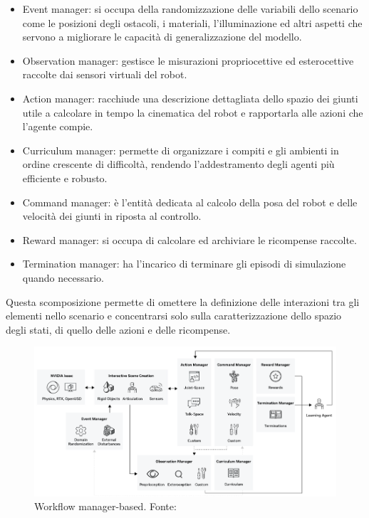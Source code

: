 \begin{itemize}
    \item Event manager: si occupa della randomizzazione delle variabili dello scenario come le posizioni degli ostacoli, i materiali, l'illuminazione ed altri aspetti che servono a migliorare le capacità di generalizzazione del modello.
    \item Observation manager: gestisce le misurazioni propriocettive ed esterocettive raccolte dai sensori virtuali del robot.
    \item Action manager: racchiude una descrizione dettagliata dello spazio dei giunti utile a calcolare in tempo la cinematica del robot e rapportarla alle azioni che l'agente compie.
    \item Curriculum manager: permette di organizzare i compiti e gli ambienti in ordine crescente di difficoltà, rendendo l'addestramento degli agenti più efficiente e robusto.
    \item Command manager: è l'entità dedicata al calcolo della posa del robot e delle velocità dei giunti in riposta al controllo.
    \item Reward manager: si occupa di calcolare ed archiviare le ricompense raccolte.
    \item Termination manager: ha l'incarico di terminare gli episodi di simulazione quando necessario.
\end{itemize}
Questa scomposizione permette di omettere la definizione delle interazioni tra gli elementi nello scenario e concentrarsi solo sulla caratterizzazione dello spazio degli stati, di quello delle azioni e delle ricompense.

\begin{figure}[h]
    \centering
    \includegraphics[width=0.95\linewidth]{immagini/isaac_lab_man_bas_workflow.png}
    \caption{Workflow manager-based. Fonte: \cite{nvidiaIsaacLab2025}}
    \label{fig:isaac_lab_man_bas_wf}
\end{figure}

